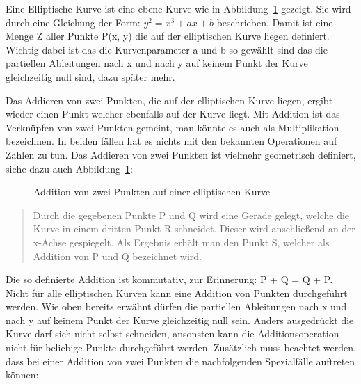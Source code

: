 		Eine Elliptische Kurve ist eine ebene Kurve wie in Abbildung~\ref{ABBILDUNG_elliptischenKurveAddition} gezeigt. Sie wird durch eine Gleichung der Form: $y^2 = x^3 + ax +b$ beschrieben. Damit ist eine Menge Z aller Punkte P(x, y) die auf der elliptischen Kurve liegen definiert. Wichtig dabei ist das die Kurvenparameter a und b so gewählt sind das die partiellen Ableitungen nach x und nach y auf keinem Punkt der Kurve gleichzeitig null sind, dazu später mehr.
		
		Das Addieren von zwei Punkten, die auf der elliptischen Kurve liegen, ergibt wieder einen Punkt welcher ebenfalls auf der Kurve liegt.\cite{Information:und:Kommunikation} Mit Addition ist das Verknüpfen von zwei Punkten gemeint, man könnte es auch als Multiplikation bezeichnen. In beiden fällen hat es nichts mit den bekannten Operationen auf Zahlen zu tun. Das Addieren von zwei Punkten ist vielmehr geometrisch definiert, siehe dazu auch Abbildung~\ref{ABBILDUNG_elliptischenKurveAddition}:
		
		\begin{figure}
			\centering
			\caption{Addition von zwei Punkten auf einer elliptischen Kurve~\cite{Information:und:Kommunikation}}
			\label{ABBILDUNG_elliptischenKurveAddition}
		\end{figure}
		
		\begin{quote}
			\begin{defi}
				Durch die gegebenen Punkte P und Q wird eine Gerade gelegt, welche die Kurve in einem dritten Punkt R schneidet. Dieser wird anschließend an der x-Achse 
				gespiegelt. Als Ergebnis erhält man den Punkt S, welcher als Addition von P und Q bezeichnet wird.\cite{Information:und:Kommunikation}
			\end{defi}
		\end{quote}
		
		Die so definierte Addition ist kommutativ, zur Erinnerung: P + Q = Q + P. Nicht für alle elliptischen Kurven kann eine Addition von Punkten durchgeführt werden. Wie oben bereits erwähnt dürfen die partiellen Ableitungen nach x und nach y auf keinem Punkt der Kurve gleichzeitig null sein. Anders ausgedrückt die Kurve darf sich nicht selbst schneiden, ansonsten kann die Additionsoperation nicht für beliebige Punkte durchgeführt werden.
		Zusätzlich muss beachtet werden, dass bei einer Addition von zwei Punkten die nachfolgenden Spezialfälle auftreten können\cite{Information:und:Kommunikation}:
		
